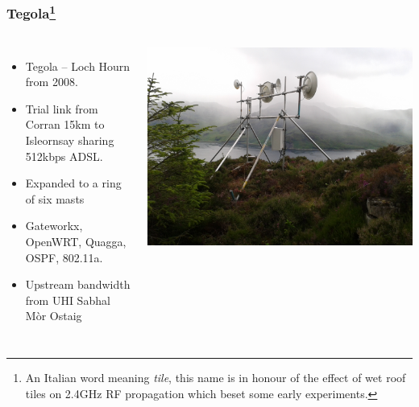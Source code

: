 \documentclass{beamer}
\begin{document}
\begin{frame}
  \frametitle{Tegola\footnote{An Italian word meaning \textit{tile},
      this name is in honour of the effect of wet roof tiles on 2.4GHz
      RF propagation which beset some early experiments.}}
  \begin{columns}
    \begin{itemize}
      \item Tegola -- Loch Hourn from 2008.
      \item Trial link from Corran 15km to Isleornsay sharing
        512kbps ADSL.
      \item Expanded to a ring of six masts
      \item Gateworkx, OpenWRT, Quagga, OSPF, 802.11a.
      \item Upstream bandwidth from UHI Sabhal M\`{o}r Ostaig
    \end{itemize}
    \hspace{-2em}
    \includegraphics[width=1.1\textwidth]{mhialairigh-from-behind.jpg}
  \end{columns}
\end{frame}
\end{document}
